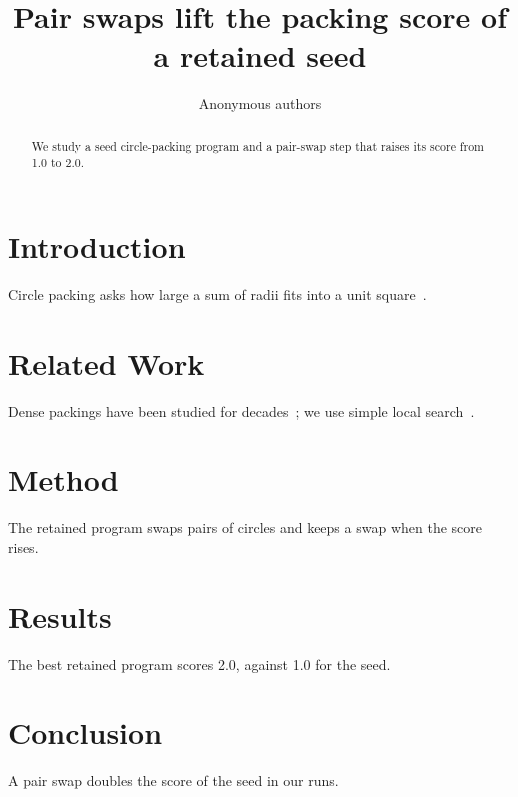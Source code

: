 \documentclass{article}
\title{Pair swaps lift the packing score of a retained seed}
\author{Anonymous authors}
\begin{document}
\maketitle
\begin{abstract}
We study a seed circle-packing program and a pair-swap step that raises its
score from 1.0 to 2.0.
\end{abstract}
\section{Introduction}
Circle packing asks how large a sum of radii fits into a unit
square~\cite{Graham1996,Collins2003}.
\section{Related Work}
Dense packings have been studied for decades~\cite{Szabo2007,Lubachevsky1997};
we use simple local search~\cite{Kirkpatrick1983}.
\section{Method}
The retained program swaps pairs of circles and keeps a swap when the score
rises.
\section{Results}
The best retained program scores 2.0, against 1.0 for the seed.
\section{Conclusion}
A pair swap doubles the score of the seed in our runs.


\end{document}

